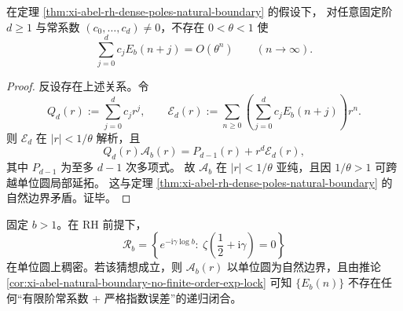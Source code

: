 \begin{corollary}[自然边界下不存在有限阶指数误差锁定]\label{cor:xi-abel-natural-boundary-no-finite-order-exp-lock}
在定理 \ref{thm:xi-abel-rh-dense-poles-natural-boundary} 的假设下，
对任意固定阶 \(d\ge 1\) 与常系数 \((c_0,\dots,c_d)\neq 0\)，不存在 \(0<\theta<1\) 使
\[
\sum_{j=0}^{d}c_jE_b(n+j)=O(\theta^n)\qquad(n\to\infty).
\]
\end{corollary}
\begin{proof}
反设存在上述关系。令
\[
Q_d(r):=\sum_{j=0}^{d}c_jr^j,\qquad
\mathcal E_d(r):=\sum_{n\ge 0}\left(\sum_{j=0}^{d}c_jE_b(n+j)\right)r^n.
\]
则 \(\mathcal E_d\) 在 \(|r|<1/\theta\) 解析，且
\[
Q_d(r)\mathcal A_b(r)=P_{d-1}(r)+r^d\mathcal E_d(r),
\]
其中 \(P_{d-1}\) 为至多 \(d-1\) 次多项式。
故 \(\mathcal A_b\) 在 \(|r|<1/\theta\) 亚纯，且因 \(1/\theta>1\) 可跨越单位圆局部延拓。
这与定理 \ref{thm:xi-abel-rh-dense-poles-natural-boundary} 的自然边界矛盾。证毕。
\end{proof}

\begin{conjecture}\label{conj:xi-abel-universal-boundary-pole-density}
固定 \(b>1\)。在 RH 前提下，
\[
\mathcal R_b=\left\{e^{-\mathrm{i}\gamma\log b}:\ \zeta\!\left(\frac12+\mathrm{i}\gamma\right)=0\right\}
\]
在单位圆上稠密。若该猜想成立，则 \(\mathcal A_b(r)\) 以单位圆为自然边界，且由推论
\ref{cor:xi-abel-natural-boundary-no-finite-order-exp-lock} 可知
\(\{E_b(n)\}\) 不存在任何“有限阶常系数 + 严格指数误差”的递归闭合。
\end{conjecture}

\endinput
